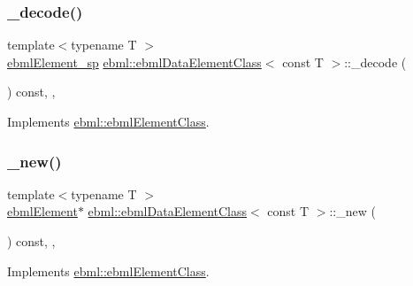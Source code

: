 \subsubsection{\texorpdfstring{\+\_\+decode()}{\_decode()}\hspace{0.1cm}{\footnotesize\ttfamily [2/2]}}
{\footnotesize\ttfamily template$<$typename T $>$ \\
\mbox{\hyperlink{namespaceebml_adad533b7705a16bb360fe56380c5e7be}{ebml\+Element\+\_\+sp}} \mbox{\hyperlink{classebml_1_1ebmlDataElementClass}{ebml\+::ebml\+Data\+Element\+Class}}$<$ const T $>$\+::\+\_\+decode (\begin{DoxyParamCaption}\item[{const \mbox{\hyperlink{classebml_1_1parseFile}{parse\+File}} \&}]{ }\end{DoxyParamCaption}) const\hspace{0.3cm}{\ttfamily [override]}, {\ttfamily [protected]}, {\ttfamily [virtual]}}



Implements \mbox{\hyperlink{classebml_1_1ebmlElementClass_aedbfff5909af215acaa3ca28643f1bc9}{ebml\+::ebml\+Element\+Class}}.

\mbox{\label{classebml_1_1ebmlDataElementClass_3_01const_01T_01_4_aaf6b66092e1987919e277661b62f2d90}} 
\subsubsection{\texorpdfstring{\+\_\+new()}{\_new()}}
{\footnotesize\ttfamily template$<$typename T $>$ \\
\mbox{\hyperlink{classebml_1_1ebmlElement}{ebml\+Element}}$\ast$ \mbox{\hyperlink{classebml_1_1ebmlDataElementClass}{ebml\+::ebml\+Data\+Element\+Class}}$<$ const T $>$\+::\+\_\+new (\begin{DoxyParamCaption}{ }\end{DoxyParamCaption}) const\hspace{0.3cm}{\ttfamily [override]}, {\ttfamily [protected]}, {\ttfamily [virtual]}}



Implements \mbox{\hyperlink{classebml_1_1ebmlElementClass_a223ede6b8bc3c85251d2d73f0256fb45}{ebml\+::ebml\+Element\+Class}}.

